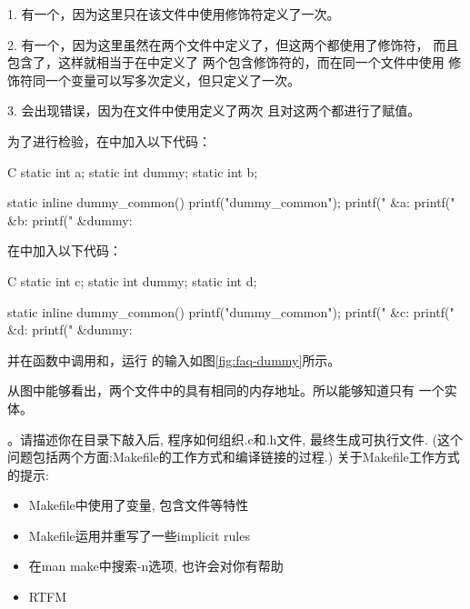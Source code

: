 \vspace{0.5em}

  1. 有一个，因为这里只在该文件中使用修饰符定义了一次。

  2. 有一个，因为这里虽然在两个文件中定义了，但这两个都使用了修饰符，
  而且包含了，这样就相当于在中定义了
  两个包含修饰符的，而在同一个文件中使用
  修饰符同一个变量可以写多次定义，但只定义了一次。

  3. 会出现错误，因为在文件中使用定义了两次
  且对这两个都进行了赋值。

  为了进行检验，在中加入以下代码：
\begin{codes*}{C}
static int a;
static int dummy;
static int b;

static inline dummy_common() {
    printf("dummy_common\n");
    printf("  &a: %
    printf("  &b: %
    printf("  &dummy: %
}
\end{codes*}
  在中加入以下代码：
\begin{codes*}{C}
static int c;
static int dummy;
static int d;

static inline dummy_common() {
    printf("dummy_common\n");
    printf("  &c: %
    printf("  &d: %
    printf("  &dummy: %
}
\end{codes*}
  并在函数中调用和，运行
  的输入如图\ref{fig:faq-dummy}所示。


  从图中能够看出，两个文件中的具有相同的内存地址。所以能够知道只有
  一个实体。

\vspace{0.5em}

  。请描述你在目录下敲入后, 
  程序如何组织.c和.h文件, 最终生成可执行文件.
  (这个问题包括两个方面:Makefile的工作方式和编译链接的过程.) 关于Makefile工作方式的提示:
  \begin{itemize}
    \item Makefile中使用了变量, 包含文件等特性
    \item Makefile运用并重写了一些implicit rules
    \item 在man make中搜索-n选项, 也许会对你有帮助
    \item RTFM
  \end{itemize}

